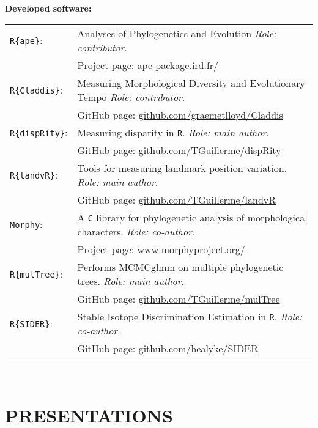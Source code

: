 \documentclass[10pt,a4paper]{article}
\begin{document}
{\raggedright\textbf{Developed software:}\\[1.5ex]
\begin{tabular}{ll}
\texttt{R\{ape\}}: & Analyses of Phylogenetics and Evolution \textit{Role: contributor}. \\
                       & Project page: \href{http://ape-package.ird.fr/}{ape-package.ird.fr/} \\
\texttt{R\{Claddis\}}: & Measuring Morphological Diversity and Evolutionary Tempo \textit{Role: contributor}. \\
                       & GitHub page: \href{https://github.com/graemetlloyd/Claddis}{github.com/graemetlloyd/Claddis} \\
\texttt{R\{dispRity\}}: & Measuring disparity in \texttt{R}. \textit{Role: main author}.\\
                       & GitHub page: \href{https://github.com/TGuillerme/dispRity}{github.com/TGuillerme/dispRity}\\
\texttt{R\{landvR\}}: & Tools for measuring landmark position variation. \textit{Role: main author}. \\
                       & GitHub page: \href{https://github.com/TGuillerme/landvR}{github.com/TGuillerme/landvR} \\
\texttt{Morphy}: & A \texttt{C} library for phylogenetic analysis of morphological characters. \textit{Role: co-author}. \\
                       & Project page: \href{http://www.morphyproject.org/}{www.morphyproject.org/} \\
\texttt{R\{mulTree\}}: & Performs MCMCglmm on multiple phylogenetic trees. \textit{Role: main author}.\\
                       & GitHub page: \href{https://github.com/TGuillerme/mulTree}{github.com/TGuillerme/mulTree} \\
\texttt{R\{SIDER\}}: & Stable Isotope Discrimination Estimation in \texttt{R}. \textit{Role: co-author}. \\
                       & GitHub page: \href{https://github.com/healyke/SIDER}{github.com/healyke/SIDER} \\
\end{tabular} \\


\bigskip
\section{PRESENTATIONS}

}
\end{document}
